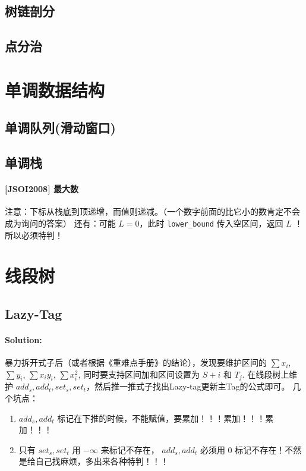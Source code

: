 \documentclass{article}
\begin{document}
		\subsection{树链剖分}
		
		\subsection{点分治}
		
	\newpage

	\section{单调数据结构}
		\subsection{单调队列(滑动窗口)}
		
		\subsection{单调栈}
		\paragraph{[JSOI2008] 最大数}
		注意：下标从栈底到顶递增，而值则递减。（一个数字前面的比它小的数肯定不会成为询问的答案）
		还有：可能 $L = 0$，此时 \lstinline|lower_bound| 传入空区间，返回 $L$ ！ 所以必须特判！
		

	\newpage

	\section{线段树}
		\subsection{Lazy-Tag} %
			\paragraph{Solution:}
			暴力拆开式子后（或者根据《重难点手册》的结论），发现要维护区间的 $\sum x_i$, $\sum y_i$, $\sum x_i y_i$, $\sum x_i^2$, 同时要支持区间加和区间设置为 $S+i \text{ 和 } T_j$.
			在线段树上维护 $add_s, add_t, set_s, set_t$，然后推一推式子找出Lazy-tag更新主Tag的公式即可。
			几个坑点：
			\begin{enumerate}
				\item $add_s, add_t$ 标记在下推的时候，不能赋值，要累加！！！累加！！！累加！！！
				\item 只有 $set_s, set_t$ 用 $-\infty$ 来标记不存在， $add_s, add_t$ 必须用 $0$ 标记不存在！不然是给自己找麻烦，多出来各种特判！！！
			\end{enumerate}
			
\end{document}
